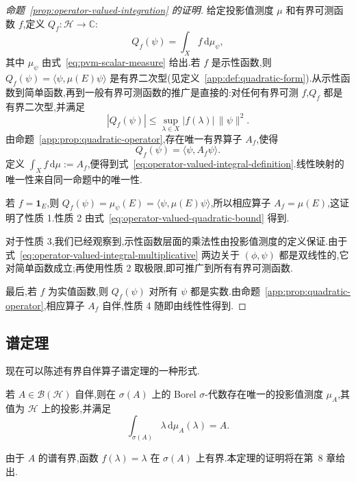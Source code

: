 \begin{proof}[命题~\ref{prop:operator-valued-integration} 的证明]
给定投影值测度 \(\mu\) 和有界可测函数 \(f\),定义 \(Q_{f}:\mathcal{H}\to\mathbb{C}\):
\[
Q_{f}(\psi)=\int_{X}f\,\mathrm{d}\mu_{\psi},
\]
其中 \(\mu_{\psi}\) 由式~\eqref{eq:pvm-scalar-measure} 给出.若 \(f\) 是示性函数,则 \(Q_{f}(\psi)=\langle\psi,\mu(E)\psi\rangle\) 是有界二次型(见定义~\ref{app:def:quadratic-form}).从示性函数到简单函数,再到一般有界可测函数的推广是直接的:对任何有界可测 \(f\),\(Q_{f}\) 都是有界二次型,并满足
\[
|Q_{f}(\psi)|\leq\sup_{\lambda\in X}|f(\lambda)|\,\|\psi\|^{2}.
\label{eq:operator-valued-quadratic-bound}
\]
由命题~\ref{app:prop:quadratic-operator},存在唯一有界算子 \(A_{f}\),使得
\[
Q_{f}(\psi)=\langle\psi,A_{f}\psi\rangle.
\]
定义 \(\int_{X}f\,\mathrm{d}\mu:=A_{f}\),便得到式~\eqref{eq:operator-valued-integral-definition}.线性映射的唯一性来自同一命题中的唯一性.

若 \(f=\mathbf{1}_{E}\),则 \(Q_{f}(\psi)=\mu_{\psi}(E)=\langle\psi,\mu(E)\psi\rangle\),所以相应算子 \(A_{f}=\mu(E)\),这证明了性质 1.性质 2 由式~\eqref{eq:operator-valued-quadratic-bound} 得到.

对于性质 3,我们已经观察到,示性函数层面的乘法性由投影值测度的定义保证.由于式~\eqref{eq:operator-valued-integral-multiplicative} 两边关于 \((\phi,\psi)\) 都是双线性的,它对简单函数成立;再使用性质 2 取极限,即可推广到所有有界可测函数.

最后,若 \(f\) 为实值函数,则 \(Q_{f}(\psi)\) 对所有 \(\psi\) 都是实数.由命题~\ref{app:prop:quadratic-operator},相应算子 \(A_{f}\) 自伴,性质 4 随即由线性性得到.
\end{proof}

\subsection{谱定理}
\label{subsec:spectral-theorem-first-form}

现在可以陈述有界自伴算子谱定理的一种形式.

\begin{theorem}\label{thm:spectral-theorem-first}
若 \(A\in\mathcal{B}(\mathcal{H})\) 自伴,则在 \(\sigma(A)\) 上的 Borel \(\sigma\)-代数存在唯一的投影值测度 \(\mu_{A}\),其值为 \(\mathcal{H}\) 上的投影,并满足
\[
\int_{\sigma(A)}\lambda\,\mathrm{d}\mu_{A}(\lambda)=A.
\label{eq:spectral-theorem-first}
\]
\end{theorem}

由于 \(A\) 的谱有界,函数 \(f(\lambda)=\lambda\) 在 \(\sigma(A)\) 上有界.本定理的证明将在第~8 章给出.

